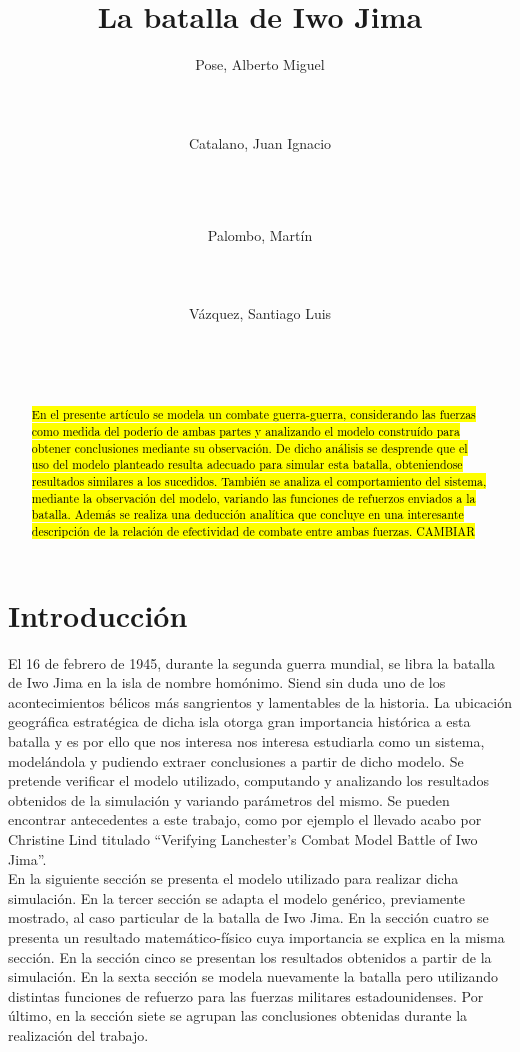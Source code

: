 \documentclass{sig-alternate}
\title{La batalla de Iwo Jima}
\author{
\alignauthor
Pose, Alberto Miguel\\
       \affaddr{ITBA}\\
       \affaddr{Madero 399}\\
       \affaddr{Buenos Aires, Argentina}\\
       \email{apose@alu.itba.edu.ar}
\alignauthor
Catalano, Juan Ignacio\\
       \affaddr{ITBA}\\
       \affaddr{Madero 399}\\
       \affaddr{Buenos Aires, Argentina}\\
       \email{jcatalan@alu.itba.edu.ar}
\and
\alignauthor 
Palombo, Martín\\
       \affaddr{ITBA}\\
       \affaddr{Madero 399}\\
       \affaddr{Buenos Aires, Argentina}\\
       \email{mpalombo@alu.itba.edu.ar}
\alignauthor 
Vázquez, Santiago Luis\\
       \affaddr{ITBA}\\
       \affaddr{Madero 399}\\
       \affaddr{Buenos Aires, Argentina}\\
       \email{savazque@alu.itba.edu.ar}
}
\date{}
\begin{document}
\maketitle

\begin{abstract}
\hl{En el presente art\'iculo se modela un combate guerra-guerra, considerando las fuerzas como medida del poder\'io de ambas partes y 
analizando el modelo constru\'ido para obtener conclusiones mediante su observaci\'on. De dicho an\'alisis se desprende que el uso del modelo planteado
resulta adecuado para simular esta batalla, obteniendose resultados similares a los sucedidos. Tambi\'en se analiza el comportamiento del sistema,
mediante la observaci\'on del modelo, variando las funciones de refuerzos enviados a la batalla. Adem\'as se realiza una deducci\'on anal\'itica que
concluye en una interesante descripci\'on de la relaci\'on de efectividad de combate entre ambas fuerzas. CAMBIAR}
\end{abstract} 



\newpage

\section{Introducci\'on}

El 16 de febrero de 1945, durante la segunda guerra mundial, se libra la batalla de Iwo Jima en la isla de nombre homónimo. 
Siend sin duda uno de los acontecimientos bélicos más sangrientos y lamentables de la historia. La ubicación geográfica estratégica de dicha
isla otorga gran importancia histórica a esta batalla y es por ello que nos interesa nos interesa estudiarla como un sistema, modelándola y 
pudiendo extraer conclusiones a partir de dicho modelo. Se pretende verificar el modelo utilizado,
computando y analizando los resultados obtenidos de la simulación y variando parámetros del mismo. Se pueden encontrar antecedentes a este 
trabajo, como por ejemplo el llevado acabo por Christine Lind titulado ``Verifying Lanchester’s Combat Model Battle of Iwo Jima''. \\ 
En la siguiente secci\'on se presenta el modelo utilizado para realizar dicha simulaci\'on. En la tercer secci\'on se adapta el modelo genérico,
previamente mostrado, al caso particular de la batalla de Iwo Jima. En la sección cuatro se presenta un resultado matem\'atico-f\'isico cuya 
importancia se explica en la misma secci\'on. En la secci\'on cinco se presentan los resultados obtenidos a partir de la simulaci\'on. En la
sexta sección se modela nuevamente la batalla pero utilizando distintas funciones de refuerzo para las fuerzas militares estadounidenses.
Por \'ultimo, en la secci\'on siete se agrupan las conclusiones obtenidas durante la realizaci\'on del trabajo.
\end{document}
